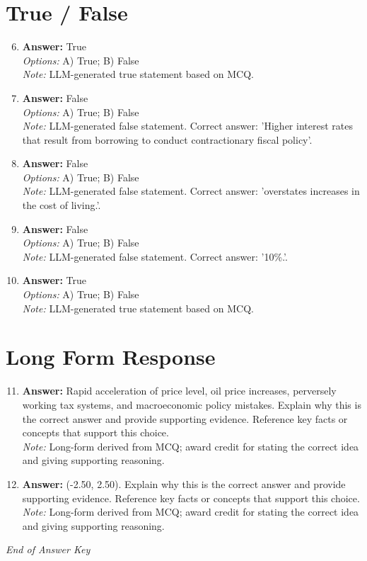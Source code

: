 \documentclass[12pt]{article}
\begin{document}
\section*{True / False}
\begin{enumerate}[label=\arabic*.]
\setcounter{enumi}{5}
\item \textbf{Answer:} True
\\ \textit{Options:} A) True; B) False
\\ \textit{Note:} LLM-generated true statement based on MCQ.
\item \textbf{Answer:} False
\\ \textit{Options:} A) True; B) False
\\ \textit{Note:} LLM-generated false statement. Correct answer: 'Higher interest rates that result from borrowing to conduct contractionary fiscal policy'.
\item \textbf{Answer:} False
\\ \textit{Options:} A) True; B) False
\\ \textit{Note:} LLM-generated false statement. Correct answer: 'overstates increases in the cost of living.'.
\item \textbf{Answer:} False
\\ \textit{Options:} A) True; B) False
\\ \textit{Note:} LLM-generated false statement. Correct answer: '10\%.'.
\item \textbf{Answer:} True
\\ \textit{Options:} A) True; B) False
\\ \textit{Note:} LLM-generated true statement based on MCQ.
\end{enumerate}

\section*{Long Form Response}
\begin{enumerate}[label=\arabic*.]
\setcounter{enumi}{10}
\item \textbf{Answer:} Rapid acceleration of price level, oil price increases, perversely working tax systems, and macroeconomic policy mistakes. Explain why this is the correct answer and provide supporting evidence. Reference key facts or concepts that support this choice.
\\ \textit{Note:} Long-form derived from MCQ; award credit for stating the correct idea and giving supporting reasoning.
\item \textbf{Answer:} (-2.50, 2.50). Explain why this is the correct answer and provide supporting evidence. Reference key facts or concepts that support this choice.
\\ \textit{Note:} Long-form derived from MCQ; award credit for stating the correct idea and giving supporting reasoning.
\end{enumerate}

\vfill
\noindent\textit{End of Answer Key}
\end{document}
